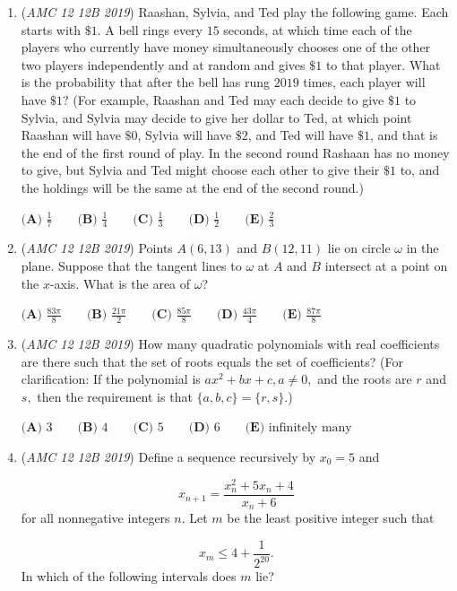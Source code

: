 \begin{enumerate}
	\item (\textit{AMC 12 12B 2019}) Raashan, Sylvia, and Ted play the following game. Each starts with $\$1$. A bell rings every $15$ seconds, at which time each of the players who currently have money simultaneously chooses one of the other two players independently and at random and gives $\$1$ to that player. What is the probability that after the bell has rung $2019$ times, each player will have $\$1$? (For example, Raashan and Ted may each decide to give $\$1$ to Sylvia, and Sylvia may decide to give her dollar to Ted, at which point Raashan will have $\$0$, Sylvia will have $\$2$, and Ted will have $\$1$, and that is the end of the first round of play. In the second round Rashaan has no money to give, but Sylvia and Ted might choose each other to give their $\$1$ to, and the holdings will be the same at the end of the second round.)


 $\textbf{(A) } \frac{1}{7} \qquad\textbf{(B) } \frac{1}{4} \qquad\textbf{(C) } \frac{1}{3} \qquad\textbf{(D) } \frac{1}{2} \qquad\textbf{(E) } \frac{2}{3}$


	\item (\textit{AMC 12 12B 2019}) Points $A(6,13)$ and $B(12,11)$ lie on circle $\omega$ in the plane. Suppose that the tangent lines to $\omega$ at $A$ and $B$ intersect at a point on the $x$-axis. What is the area of $\omega$?


 $\textbf{(A) }\frac{83\pi}{8}\qquad\textbf{(B) }\frac{21\pi}{2}\qquad\textbf{(C) } \frac{85\pi}{8}\qquad\textbf{(D) }\frac{43\pi}{4}\qquad\textbf{(E) }\frac{87\pi}{8}$


	\item (\textit{AMC 12 12B 2019}) How many quadratic polynomials with real coefficients are there such that the set of roots equals the set of coefficients? (For clarification: If the polynomial is $ax^2+bx+c,a\neq 0,$ and the roots are $r$ and $s,$ then the requirement is that $\{a,b,c\}=\{r,s\}$.)


 $\textbf{(A) } 3 \qquad\textbf{(B) } 4 \qquad\textbf{(C) } 5 \qquad\textbf{(D) } 6 \qquad\textbf{(E) } \text{infinitely many}$


	\item (\textit{AMC 12 12B 2019}) Define a sequence recursively by $x_0=5$ and

 \[x_{n+1}=\frac{x_n^2+5x_n+4}{x_n+6}\]for all nonnegative integers $n.$ Let $m$ be the least positive integer such that

 \[x_m\leq 4+\frac{1}{2^{20}}.\]In which of the following intervals does $m$ lie?



\end{enumerate}
